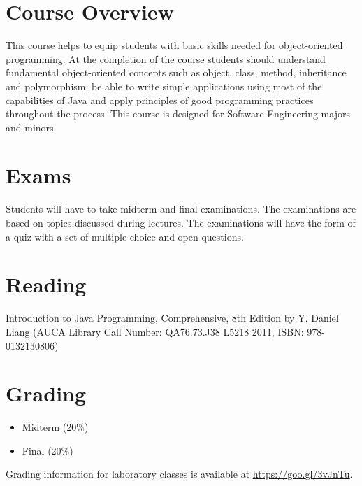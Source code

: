 \documentclass[12pt,a4paper,oneside]{article}
\begin{document}
    \section{Course Overview}

        This course helps to equip students with basic skills needed for
        object-oriented programming. At the completion of the course students
        should understand fundamental object-oriented concepts such as object,
        class, method, inheritance and polymorphism; be able to write simple
        applications using most of the capabilities of Java and apply principles
        of good programming practices throughout the process. This course is
        designed for Software Engineering majors and minors.

    \section{Exams}

        Students will have to take midterm and final examinations. The
        examinations are based on topics discussed during lectures. The
        examinations will have the form of a quiz with a set of multiple choice
        and open questions.

    \section{Reading}

        Introduction to Java Programming, Comprehensive, 8th Edition by Y.
        Daniel Liang (AUCA Library Call Number: QA76.73.J38 L5218 2011, ISBN:
        978-0132130806)

    \section{Grading}

        \begin{itemize}
            \item Midterm (20\%)
            \item Final (20\%)
        \end{itemize}

        Grading information for laboratory classes is available at
        \url{https://goo.gl/3vJnTu}.
\end{document}
